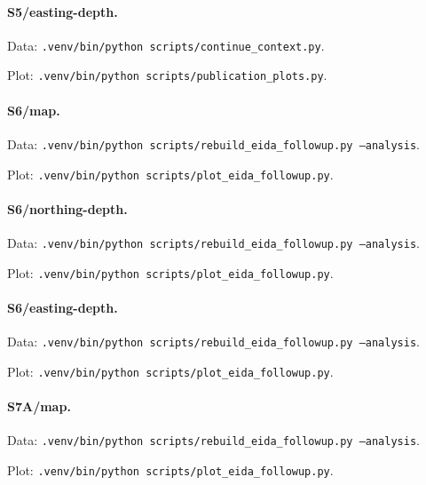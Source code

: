 \paragraph{S5/easting-depth.}
\par Data: \texttt{.venv/bin/python scripts/continue\_context.py}.
\par Plot: \texttt{.venv/bin/python scripts/publication\_plots.py}.
\par{}
\paragraph{S6/map.}
\par Data: \texttt{.venv/bin/python scripts/rebuild\_eida\_followup.py --analysis}.
\par Plot: \texttt{.venv/bin/python scripts/plot\_eida\_followup.py}.
\par{}
\paragraph{S6/northing-depth.}
\par Data: \texttt{.venv/bin/python scripts/rebuild\_eida\_followup.py --analysis}.
\par Plot: \texttt{.venv/bin/python scripts/plot\_eida\_followup.py}.
\par{}
\paragraph{S6/easting-depth.}
\par Data: \texttt{.venv/bin/python scripts/rebuild\_eida\_followup.py --analysis}.
\par Plot: \texttt{.venv/bin/python scripts/plot\_eida\_followup.py}.
\par{}
\paragraph{S7A/map.}
\par Data: \texttt{.venv/bin/python scripts/rebuild\_eida\_followup.py --analysis}.
\par Plot: \texttt{.venv/bin/python scripts/plot\_eida\_followup.py}.
\par{}
